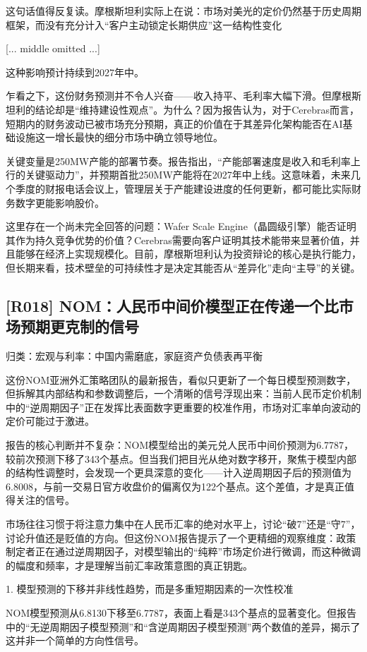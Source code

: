 \documentclass[11pt]{ctexart}
\begin{document}
这句话值得反复读。摩根斯坦利实际上在说：市场对美光的定价仍然基于历史周期框架，而没有充分计入“客户主动锁定长期供应”这一结构性变化

[... middle omitted ...]

这种影响预计持续到2027年中。

乍看之下，这份财务预测并不令人兴奋——收入持平、毛利率大幅下滑。但摩根斯坦利的结论却是“维持建设性观点”。为什么？因为报告认为，对于Cerebras而言，短期内的财务波动已被市场充分预期，真正的价值在于其差异化架构能否在AI基础设施这一增长最快的细分市场中确立领导地位。

关键变量是250MW产能的部署节奏。报告指出，“产能部署速度是收入和毛利率上行的关键驱动力”，并预期首批250MW产能将在2027年中上线。这意味着，未来几个季度的财报电话会议上，管理层关于产能建设进度的任何更新，都可能比实际财务数字更能影响股价。

这里存在一个尚未完全回答的问题：Wafer Scale Engine（晶圆级引擎）能否证明其作为持久竞争优势的价值？Cerebras需要向客户证明其技术能带来显著价值，并且能够在经济上实现规模化。目前，摩根斯坦利认为投资辩论的核心是执行能力，但长期来看，技术壁垒的可持续性才是决定其能否从“差异化”走向“主导”的关键。

\subsection{[R018] NOM：人民币中间价模型正在传递一个比市场预期更克制的信号}
{\small\color{refgray}归类：宏观与利率：中国内需磨底，家庭资产负债表再平衡}

这份NOM亚洲外汇策略团队的最新报告，看似只更新了一个每日模型预测数字，但拆解其内部结构和参数调整后，一个清晰的信号浮现出来：当前人民币定价机制中的“逆周期因子”正在发挥比表面数字更重要的校准作用，市场对汇率单向波动的定价可能过于激进。

报告的核心判断并不复杂：NOM模型给出的美元兑人民币中间价预测为6.7787，较前次预测下移了343个基点。但当我们把目光从绝对数字移开，聚焦于模型内部的结构性调整时，会发现一个更具深意的变化——计入逆周期因子后的预测值为6.8008，与前一交易日官方收盘价的偏离仅为122个基点。这个差值，才是真正值得关注的信号。

市场往往习惯于将注意力集中在人民币汇率的绝对水平上，讨论“破7”还是“守7”，讨论升值还是贬值的方向。但这份NOM报告提示了一个更精细的观察维度：政策制定者正在通过逆周期因子，对模型输出的“纯粹”市场定价进行微调，而这种微调的幅度和频率，才是理解当前汇率政策意图的真正钥匙。

1. 模型预测的下移并非线性趋势，而是多重短期因素的一次性校准

NOM模型预测从6.8130下移至6.7787，表面上看是343个基点的显著变化。但报告中的“无逆周期因子模型预测”和“含逆周期因子模型预测”两个数值的差异，揭示了这并非一个简单的方向性信号。
\end{document}
